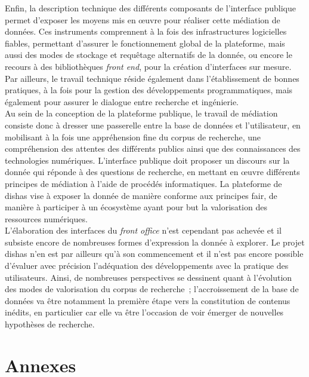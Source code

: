 \documentclass[a4paper,12pt,twoside]{book}
\newcommand{\eng}{\emph}
\newcommand{\bdd}{base de données\xspace}
\newcommand{\fo}{\eng{front office}\xspace}
\newcommand{\dishas}{\gls{dishas}\xspace}
\newcommand{\fair}{\gls{fair}\xspace}
\begin{document}
Enfin, la description technique des différents composants de l'interface publique permet d'exposer les moyens mis en œuvre pour réaliser cette médiation de données. Ces instruments comprennent à la fois des infrastructures logicielles fiables, permettant d'assurer le fonctionnement global de la plateforme, mais aussi des modes de stockage et requêtage alternatifs de la donnée, ou encore le recours à des bibliothèques \eng{front end}, pour la création d'interfaces sur mesure. Par ailleurs, le travail technique réside également dans l'établissement de bonnes pratiques, à la fois pour la gestion des développements programmatiques, mais également pour assurer le dialogue entre recherche et ingénierie.\\

Au sein de la conception de la plateforme publique, le travail de médiation consiste donc à dresser une passerelle entre la \bdd et l'utilisateur, en mobilisant à la fois une appréhension fine du corpus de recherche, une compréhension des attentes des différents publics ainsi que des connaissances des technologies numériques. L'interface publique doit proposer un discours sur la donnée qui réponde à des questions de recherche, en mettant en œuvre différents principes de médiation à l'aide de procédés informatiques. La plateforme de \dishas vise à exposer la donnée de manière conforme aux principes \fair, de manière à participer à un écosystème ayant pour but la valorisation des ressources numériques.\\

L'élaboration des interfaces du \fo n'est cependant pas achevée et il subsiste encore de nombreuses formes d'expression la donnée à explorer. Le projet \dishas n'en est par ailleurs qu'à son commencement et il n'est pas encore possible d'évaluer avec précision l'adéquation des développements avec la pratique des utilisateurs. Ainsi, de nombreuses perspectives se dessinent quant à l'évolution des modes de valorisation du corpus de recherche~; l'accroissement de la base de données va être notamment la première étape vers la constitution de contenus inédits, en particulier car elle va être l'occasion de voir émerger de nouvelles hypothèses de recherche.

\appendix
	\part*{Annexes}	
	
\end{document}
